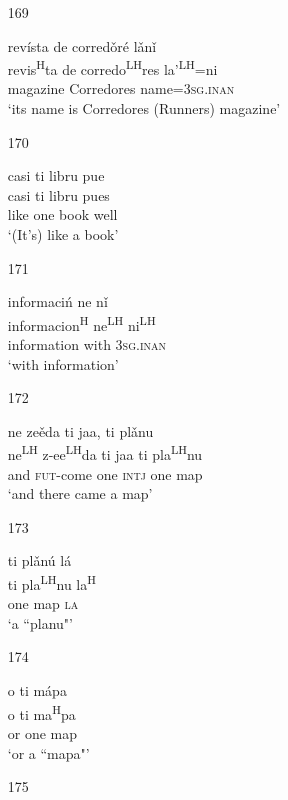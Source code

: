 \begin{itemize}
\item[169]
 
\glll   rev\'{i}sta de corred\v{o}r\'{e} l\v{a}n\v{i}\\
revis\textsuperscript{H}ta de corredo\textsuperscript{LH}res la'\textsuperscript{LH}=ni\\
magazine Corredores name=\textsc{3sg.inan}\\
\glt `its name is Corredores (Runners) magazine'
 


\item[170]
 
\glll   casi ti libru pue\\
 casi ti libru pues\\
like one book well\\
\glt `(It's) like a book'
 

\item[171]
 
\glll   informaci\'{n} ne n\v{i}\\
informacion\textsuperscript{H} ne\textsuperscript{LH} ni\textsuperscript{LH}\\
information with \textsc{3sg.inan}\\
\glt `with information'
 

\item[172]

\glll   ne ze\v{e}da ti jaa, ti pl\v{a}nu\\
ne\textsuperscript{LH} z-ee\textsuperscript{LH}da  ti jaa ti pla\textsuperscript{LH}nu\\
and \textsc{fut}-come one \textsc{intj} one map\\
\glt `and there came a map'
 

\item[173]
 
\glll   ti pl\v{a}n\'{u} l\'{a}\\
 ti pla\textsuperscript{LH}nu la\textsuperscript{H}\\
one map \textsc{la}\\
\glt `a ``planu"'
 


\item[174]
 
\glll   o ti m\'{a}pa\\
o ti ma\textsuperscript{H}pa\\
or one map\\
\glt `or a ``mapa"'
 


\item[175]
 

\end{itemize}
